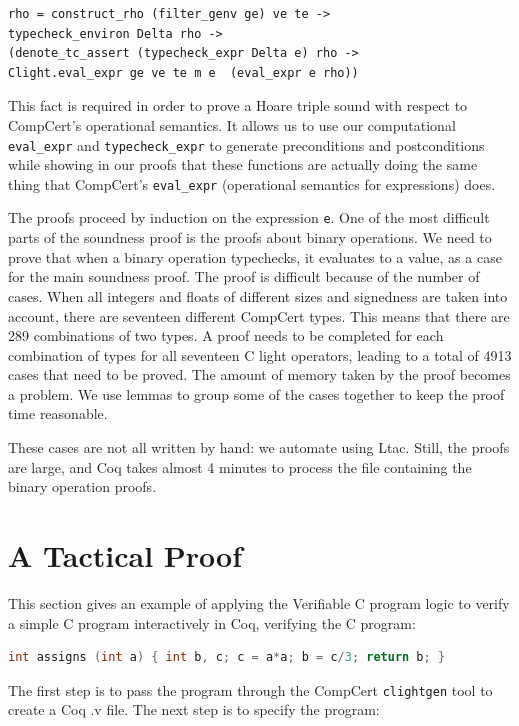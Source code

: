 \documentclass{puthesis}
\begin{document}
\begin{lstlisting}
rho = construct_rho (filter_genv ge) ve te ->
typecheck_environ Delta rho ->
(denote_tc_assert (typecheck_expr Delta e) rho ->
Clight.eval_expr ge ve te m e  (eval_expr e rho))
\end{lstlisting}

This fact is required in order to prove a Hoare triple sound with
respect to CompCert's operational semantics. It allows us to use our
computational \lstinline|eval_expr| and \lstinline|typecheck_expr| to
generate preconditions and postconditions while showing in our proofs
that these functions are actually doing the same thing that CompCert's
\lstinline|eval_expr| (operational semantics for expressions) does.

The proofs proceed by induction on the expression \lstinline|e|. One
of the most difficult parts of the soundness proof is the proofs about
binary operations. We need to prove that when a binary operation
typechecks, it evaluates to a value, as a case for the main soundness
proof. The proof is difficult because of the number of cases. When all
integers and floats of different sizes and signedness are taken into
account, there are seventeen different CompCert types. This means that
there are 289 combinations of two types. A proof needs to be completed
for each combination of types for all seventeen C light operators,
leading to a total of 4913 cases that need to be proved.  The amount
of memory taken by the proof becomes a problem. We use lemmas to group
some of the cases together to keep the proof time reasonable.

These cases are not all written by hand: we automate using Ltac.
Still, the proofs are large, and Coq takes almost 4 minutes to process
the file containing the binary operation proofs.


\section{A Tactical Proof}
\label{sec:example}
This section gives an example of applying the Verifiable C program logic to
verify a simple C program interactively in Coq, verifying the C
program:

\begin{lstlisting}[language=c]
int assigns (int a) { int b, c; c = a*a; b = c/3; return b; }
\end{lstlisting}

The first step is to pass the program through the CompCert
\lstinline|clightgen| tool to create a Coq .v file. The next step is
to specify the program:
\end{document}
